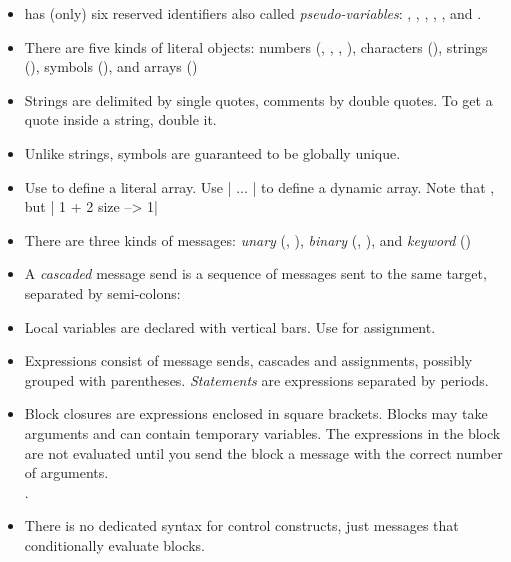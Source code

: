 \documentclass[a4paper,10pt,twoside]{book}
\begin{document}
\begin{itemize}

\item	\sq has (only) six reserved identifiers also called \textit{pseudo-variables}:
		, , , , , and .

\item	There are five kinds of literal objects:
		numbers (, , , ), characters (), strings (), symbols (), and arrays ()

\item	Strings are delimited by single quotes, comments by double quotes.
		To get a quote inside a string, double it.

\item	Unlike strings, symbols are guaranteed to be globally unique.

\item	Use  to define a literal array.
		Use \ct|{ ... }| to define a dynamic array.
		Note that 
		, but 
		\ct|{ 1 + 2 } size --> 1|

\item	There are three kinds of messages:
		\emph{unary} (\eg {}, ),
		\emph{binary} (\eg {}, ), and
		\emph{keyword} (\eg {})

\item	A \emph{cascaded} message send is a sequence of messages sent to the same target, separated by semi-colons:

\item	Local variables are declared with vertical bars.
		Use \ct{:=} for assignment.

\item	Expressions consist of message sends, cascades and assignments, possibly grouped with parentheses.
		\emph{Statements} are expressions separated by periods.

\item	Block closures are expressions enclosed in square brackets.
		Blocks may take arguments and can contain temporary variables.
		The expressions in the block are not evaluated until you send the block a 
		 message with the correct number of arguments.\\
		.

\item	There is no dedicated syntax for control constructs, just messages that conditionally evaluate blocks.\\

\end{itemize}

\ifx\wholebook\relax\else
\end{document}
